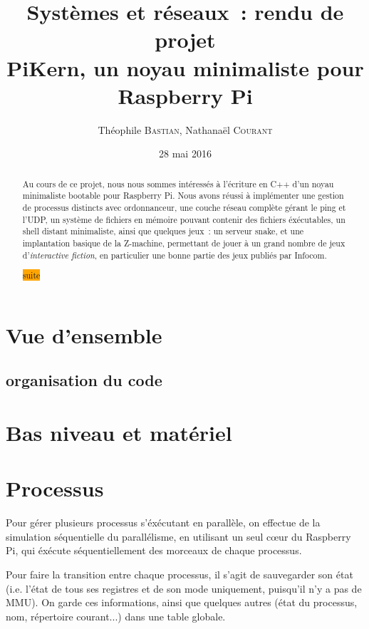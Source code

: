 \documentclass[11pt,a4paper]{article}
\author{Théophile \textsc{Bastian}, Nathanaël \textsc{Courant}}
\title{Systèmes et réseaux~: rendu de projet\\
{\small PiKern, un noyau minimaliste pour Raspberry Pi}}
\date{28 mai 2016}
\newcommand{\todo}[1]{\colorbox{orange}{\color{blue}{\Large TODO:} #1}}
\begin{document}
\maketitle

\begin{abstract}
Au cours de ce projet, nous nous sommes intéressés à l'écriture en C++ d'un
noyau minimaliste bootable pour Raspberry Pi. Nous avons réussi à implémenter
une gestion de processus distincts avec ordonnanceur, une couche réseau
complète gérant le ping et l'UDP, un système de fichiers en mémoire
pouvant contenir des fichiers éxécutables, un shell distant
minimaliste, ainsi que quelques jeux~: un serveur snake, et une
implantation basique de la Z-machine, permettant de jouer à un grand
nombre de jeux d'\textit{interactive fiction}, en particulier une
bonne partie des jeux publiés par Infocom.

	\todo{suite}
\end{abstract}

\tableofcontents
\newpage

\section{Vue d'ensemble}

\subsection{organisation du code}

\section{Bas niveau et matériel}

\section{Processus}

Pour gérer plusieurs processus s'éxécutant en parallèle, on effectue
de la simulation séquentielle du parallélisme, en utilisant un seul
cœur du Raspberry Pi, qui éxécute séquentiellement des morceaux de
chaque processus.

Pour faire la transition entre chaque processus, il s'agit de
sauvegarder son état (i.e. l'état de tous ses registres et de son mode
uniquement, puisqu'il n'y a pas de MMU). On garde ces informations,
ainsi que quelques autres (état du processus, nom, répertoire
courant...) dans une table globale.
\end{document}
